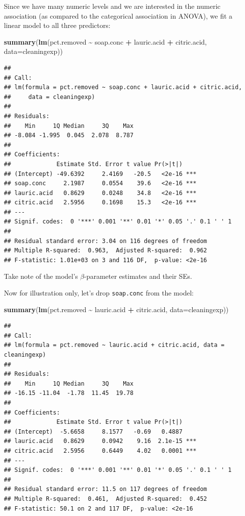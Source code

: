 \documentclass[
]{book}
\newenvironment{Shaded}{\begin{snugshade}}{\end{snugshade}}
\newcommand{\AttributeTok}[1]{\textcolor[rgb]{0.13,0.29,0.53}{#1}}
\newcommand{\FunctionTok}[1]{\textcolor[rgb]{0.13,0.29,0.53}{\textbf{#1}}}
\newcommand{\NormalTok}[1]{#1}
\newcommand{\SpecialCharTok}[1]{\textcolor[rgb]{0.81,0.36,0.00}{\textbf{#1}}}
\begin{document}
Since we have many numeric levels and we are interested in the numeric association (as compared to the categorical association in ANOVA), we fit a linear model to all three predictors:

\begin{Shaded}
\begin{Highlighting}[]
\FunctionTok{summary}\NormalTok{(}\FunctionTok{lm}\NormalTok{(pct.removed }\SpecialCharTok{\textasciitilde{}}\NormalTok{ soap.conc }\SpecialCharTok{+}\NormalTok{ lauric.acid }\SpecialCharTok{+}\NormalTok{ citric.acid, }\AttributeTok{data=}\NormalTok{cleaningexp))}
\end{Highlighting}
\end{Shaded}

\begin{verbatim}
## 
## Call:
## lm(formula = pct.removed ~ soap.conc + lauric.acid + citric.acid, 
##     data = cleaningexp)
## 
## Residuals:
##    Min     1Q Median     3Q    Max 
## -8.084 -1.995  0.045  2.078  8.787 
## 
## Coefficients:
##             Estimate Std. Error t value Pr(>|t|)    
## (Intercept) -49.6392     2.4169   -20.5   <2e-16 ***
## soap.conc     2.1987     0.0554    39.6   <2e-16 ***
## lauric.acid   0.8629     0.0248    34.8   <2e-16 ***
## citric.acid   2.5956     0.1698    15.3   <2e-16 ***
## ---
## Signif. codes:  0 '***' 0.001 '**' 0.01 '*' 0.05 '.' 0.1 ' ' 1
## 
## Residual standard error: 3.04 on 116 degrees of freedom
## Multiple R-squared:  0.963,  Adjusted R-squared:  0.962 
## F-statistic: 1.01e+03 on 3 and 116 DF,  p-value: <2e-16
\end{verbatim}

Take note of the model's \(\beta\)-parameter estimates and their SEs.

Now for illustration only, let's drop \texttt{soap.conc} from the model:

\begin{Shaded}
\begin{Highlighting}[]
\FunctionTok{summary}\NormalTok{(}\FunctionTok{lm}\NormalTok{(pct.removed }\SpecialCharTok{\textasciitilde{}}\NormalTok{ lauric.acid }\SpecialCharTok{+}\NormalTok{ citric.acid, }\AttributeTok{data=}\NormalTok{cleaningexp))}
\end{Highlighting}
\end{Shaded}

\begin{verbatim}
## 
## Call:
## lm(formula = pct.removed ~ lauric.acid + citric.acid, data = cleaningexp)
## 
## Residuals:
##    Min     1Q Median     3Q    Max 
## -16.15 -11.04  -1.78  11.45  19.78 
## 
## Coefficients:
##             Estimate Std. Error t value Pr(>|t|)    
## (Intercept)  -5.6658     8.1577   -0.69   0.4887    
## lauric.acid   0.8629     0.0942    9.16  2.1e-15 ***
## citric.acid   2.5956     0.6449    4.02   0.0001 ***
## ---
## Signif. codes:  0 '***' 0.001 '**' 0.01 '*' 0.05 '.' 0.1 ' ' 1
## 
## Residual standard error: 11.5 on 117 degrees of freedom
## Multiple R-squared:  0.461,  Adjusted R-squared:  0.452 
## F-statistic: 50.1 on 2 and 117 DF,  p-value: <2e-16
\end{verbatim}
\end{document}

